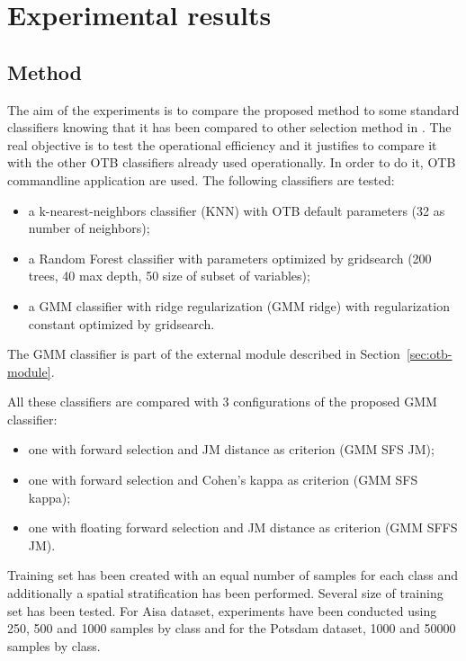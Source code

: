 \documentclass[journal,peerreview,onecolumn]{IEEEtran}
\begin{document}
\section{Experimental results}
\label{sec:test}

    \subsection{Method}
    \label{sec:method}

    The aim of the experiments is to compare the proposed method to some standard classifiers knowing that it has been compared to other selection method in \cite{fauvel2015fast}. The real objective is to test the operational efficiency and it justifies to compare it with the other OTB classifiers already used operationally. In order to do it, OTB commandline application are used. The following classifiers are tested:
    \begin{itemize}
        \item a k-nearest-neighbors classifier (KNN) with OTB default parameters (32 as number of neighbors);
        \item a Random Forest classifier with parameters optimized by gridsearch (200 trees, 40 max depth, 50 size of subset of variables);
        \item a GMM classifier with ridge regularization (GMM ridge) with regularization constant optimized by gridsearch.
    \end{itemize}
    The GMM classifier is part of the external module described in Section~\ref{sec:otb-module}.

    All these classifiers are compared with 3 configurations of the proposed GMM classifier:
    \begin{itemize}
        \item one with forward selection and JM distance as criterion (GMM SFS JM);
        \item one with forward selection and Cohen's kappa as criterion (GMM SFS kappa);
        \item one with floating forward selection and JM distance as criterion (GMM SFFS JM).
    \end{itemize}

    Training set has been created with an equal number of samples for each class and additionally a spatial stratification has been performed. Several size of training set has been tested. For Aisa dataset, experiments have been conducted using 250, 500 and 1000 samples by class and for the Potsdam dataset, 1000 and 50000 samples by class.
\end{document}
